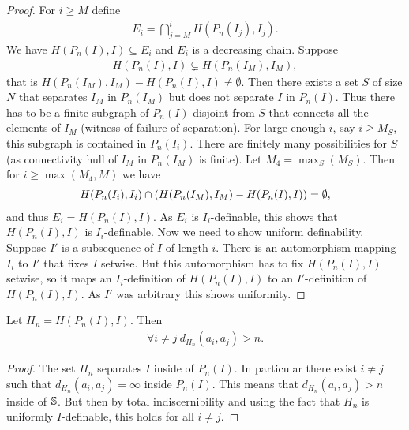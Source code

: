 \begin{proof}
  For $i \geq M$ define
  \begin{align*}
    E_i = \bigcap_{j = M}^{i} H(P_n(I_j), I_j).
  \end{align*}
  We have $H(P_n(I), I) \subseteq E_i$ and $E_i$ is a decreasing chain.
  Suppose
  \begin{align*}
    H(P_n(I), I) \subsetneq H(P_n(I_M), I_M),    
  \end{align*}
  that is ${H(P_n(I_M), I_M) - H(P_n(I), I)} \neq \emptyset$.
  Then there exists a set $S$ of size $N$ that separates $I_M$ in $P_n(I_M)$ but does not separate $I$ in $P_n(I)$.
  Thus there has to be a finite subgraph of $P_n(I)$ disjoint from $S$ that connects all the elements of $I_M$ (witness of failure of separation).
  For large enough $i$, say $i \geq M_S$, this subgraph is contained in $P_n(I_i)$.
  There are finitely many possibilities for $S$ (as connectivity hull of $I_M$ in $P_n(I_M)$ is finite).
  Let $M_4 = \max_S(M_S)$.
  Then for $i \geq \max(M_4, M)$ we have
  \begin{align*}
    H(P_n(I_i), I_i) \cap \left(H(P_n(I_M), I_M) - H(P_n(I), I)\right) = \emptyset,    
  \end{align*}
  and thus $E_i = H(P_n(I), I)$.
  As $E_i$ is $I_i$-definable, this shows that $H(P_n(I), I)$ is $I_i$-definable.
  Now we need to show uniform definability.
  Suppose $I'$ is a subsequence of $I$ of length $i$.
  There is an automorphism mapping $I_i$ to $I'$ that fixes $I$ setwise.
  But this automorphism has to fix $H(P_n(I), I)$ setwise,
  so it maps an $I_i$-definition of $H(P_n(I), I)$ to an $I'$-definition of $H(P_n(I), I)$.
  As $I'$ was arbitrary this shows uniformity.
\end{proof}

\begin{Corollary} \label{inf_dis_corr}
  Let $H_n = H(P_n(I), I)$.
  Then 
  \begin{align*}
    \forall i \neq j \ d_{H_n}(a_i, a_j) > n.
  \end{align*}
\end{Corollary}

\begin{proof}
  The set $H_n$ separates $I$ inside of $P_n(I)$.
  In particular there exist $i \neq j$ such that $d_{H_n}(a_i, a_j) = \infty$ inside $P_n(I)$.
  This means that $d_{H_n}(a_i, a_j) > n$ inside of $\mathbb S$.
  But then by total indiscernibility and using the fact that $H_n$ is uniformly $I$-definable, this holds for all $i \neq j$.
\end{proof}

